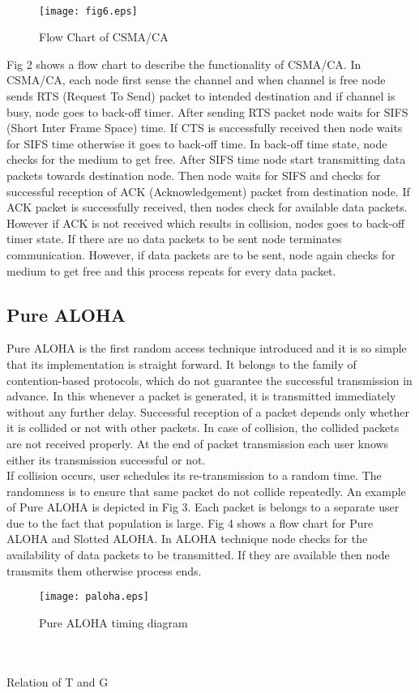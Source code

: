 \documentclass[11pt, conference, compsocconf, onecolumn]{IEEEtran}
\begin{document}
\\
\begin{figure}[!h]
\centering
\caption{Flow Chart of CSMA/CA}
\texttt{[image: fig6.eps]}
\end{figure}
Fig 2 shows a flow chart to describe the functionality of CSMA/CA. In CSMA/CA, each node first sense the channel and when channel is free node sends RTS (Request To Send) packet to intended destination and if channel is busy, node goes to back-off timer. After sending RTS packet node waits for SIFS (Short Inter Frame Space) time. If CTS is successfully received then node waits for SIFS time otherwise it goes to back-off time. In back-off time state, node checks for the medium to get free. After SIFS time node start transmitting data packets towards destination node. Then node waits for SIFS and checks for successful reception of ACK (Acknowledgement) packet from destination node. If ACK packet is successfully received, then nodes check for available data packets. However if ACK is not received which results in collision, nodes goes to back-off timer state. If there are no data packets to be sent node terminates communication. However, if data packets are to be sent, node again checks for medium to get free and this process repeats for every data packet.


\subsection{Pure ALOHA}
Pure ALOHA is the first random access technique introduced and it is so simple that its implementation is straight forward. It belongs to the family of contention-based protocols, which do not guarantee the successful transmission in advance. In this whenever a packet is generated, it is transmitted immediately without any further delay. Successful reception of a packet depends only whether it is collided or not with other packets. In case of collision, the collided packets are not received properly. At the end of packet transmission each user knows either its transmission successful or not.
\\
\indent If collision occurs, user schedules its re-transmission to a random time. The randomness is to ensure that same packet do not collide repeatedly. An example of Pure ALOHA is depicted in Fig 3. Each packet is belongs to a separate user due to the fact that population is large.
Fig 4 shows a flow chart for Pure ALOHA and Slotted ALOHA. In ALOHA technique node checks for the availability of data packets to be transmitted.
If they are available then node transmits them otherwise process ends.
\begin{figure}[!h]
\centering
\caption{Pure ALOHA timing diagram}
\texttt{[image: paloha.eps]}
\end{figure}
\\\\
Relation of T and G
\end{document}
